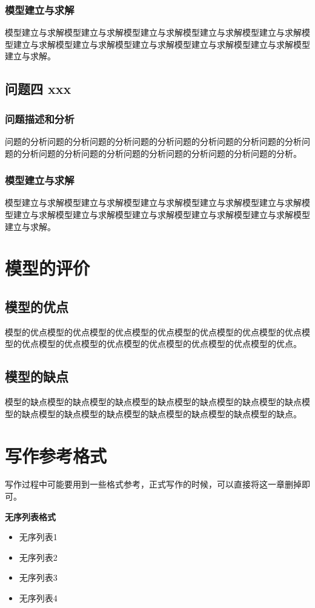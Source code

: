 \documentclass[bwprint]{gmcmthesis}
\numberwithin{figure}{section}
\begin{document}
\subsubsection{模型建立与求解}
模型建立与求解模型建立与求解模型建立与求解模型建立与求解模型建立与求解模型建立与求解模型建立与求解模型建立与求解模型建立与求解模型建立与求解模型建立与求解。

\subsection{问题四 xxx}
\subsubsection{问题描述和分析}
问题的分析问题的分析问题的分析问题的分析问题的分析问题的分析问题的分析问题的分析问题的分析问题的分析问题的分析问题的分析问题的分析问题的分析。
\subsubsection{模型建立与求解}
模型建立与求解模型建立与求解模型建立与求解模型建立与求解模型建立与求解模型建立与求解模型建立与求解模型建立与求解模型建立与求解模型建立与求解模型建立与求解。

\section{模型的评价}
\subsection{模型的优点}
模型的优点模型的优点模型的优点模型的优点模型的优点模型的优点模型的优点模型的优点模型的优点模型的优点模型的优点模型的优点模型的优点模型的优点。
\subsection{模型的缺点}
模型的缺点模型的缺点模型的缺点模型的缺点模型的缺点模型的缺点模型的缺点模型的缺点模型的缺点模型的缺点模型的缺点模型的缺点模型的缺点模型的缺点。



\section{写作参考格式}
写作过程中可能要用到一些格式参考，正式写作的时候，可以直接将这一章删掉即可。

\textbf{无序列表格式}
\begin{itemize}
\item 无序列表1
\item 无序列表2
\item 无序列表3
\item 无序列表4
\end{itemize}
\end{document}
